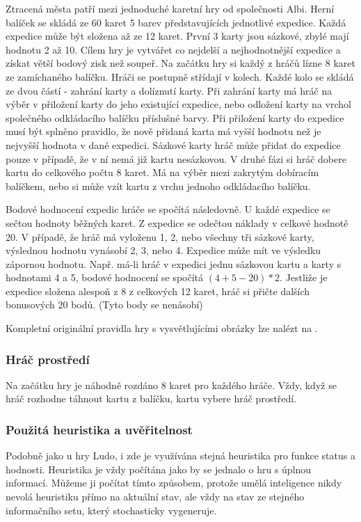 Ztracená města patří mezi jednoduché karetní hry od společnosti Albi. Herní balíček se skládá ze 60 karet 5 barev představujících jednotlivé expedice. Každá expedice může být složena až ze 12 karet. První 3 karty jsou sázkové, zbylé mají hodnotu 2 až 10. Cílem hry je vytvářet co nejdelší a nejhodnotnější expedice a získat větší bodový zisk než soupeř. Na začátku hry si každý z hráčů lízne 8 karet ze zamíchaného balíčku. Hráči se postupně střídají v kolech. Každé kolo se skládá ze dvou částí - zahrání karty a dolíznutí karty. Při zahrání karty má hráč na výběr v přiložení karty do jeho existující expedice, nebo odložení karty na vrchol společného odkládacího balíčku příslušné barvy. Při přiložení karty do expedice musí být splněno pravidlo, že nově přidaná karta má vyšší hodnotu než je nejvyšší hodnota v dané expedici. Sázkové karty hráč může přidat do expedice pouze v případě, že v ní nemá již kartu nesázkovou. V druhé fázi si hráč dobere kartu do celkového počtu 8 karet. Má na výběr mezi zakrytým dobíracím balíčkem, nebo si může vzít kartu z vrchu jednoho odkládacího balíčku.

Bodové hodnocení expedic hráče se spočítá následovně. U každé expedice se sečtou hodnoty běžných karet. Z expedice se odečtou náklady v celkové hodnotě 20. V případě, že hráč má vyloženu 1, 2, nebo všechny tři sázkové karty, výslednou hodnotu vynásobí 2, 3, nebo 4. Expedice může mít ve výsledku zápornou hodnotu. Např. má-li hráč v expedici jednu sázkovou kartu a karty s hodnotami 4 a 5, bodové hodnocení se spočítá $(4 + 5 - 20) * 2$. Jestliže je expedice složena alespoň z 8 z celkových 12 karet, hráč si přičte dalších bonusových 20 bodů. (Tyto body se nenásobí)

Kompletní originální pravidla hry s vysvětlujícími obrázky lze nalézt na \cite{Neni}.

\subsubsection{Hráč prostředí}

Na začátku hry je náhodně rozdáno 8 karet pro každého hráče. Vždy, když se hráč rozhodne táhnout kartu z balíčku, kartu vybere hráč prostředí.

\subsubsection{Použitá heuristika a uvěřitelnost}

Podobně jako u hry Ludo, i zde je využívána stejná heuristika pro funkce status a hodnosti. Heuristika je vždy počítána jako by se jednalo o hru s úplnou informací. Můžeme ji počítat tímto způsobem, protože umělá inteligence nikdy nevolá heuristiku přímo na aktuální stav, ale vždy na stav ze stejného informačního setu, který stochasticky vygeneruje.

